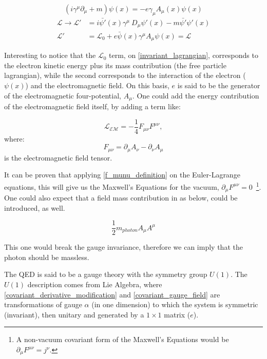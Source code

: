\begin{equation}
        (i \gamma^\mu \partial_\mu + m)\psi(x) = -e\gamma_\mu A_\mu(x) \psi(x) 
    \label{invariant_dirac_equation}
\end{equation}
\begin{equation}
    \begin{split}
        \mathcal{L} \rightarrow \mathcal{L'} &= i\bar{\psi'}(x)\gamma^\mu\ D_\mu\psi'(x)-m\bar{\psi'}\psi'(x) \\
        \mathcal{L'} &= \mathcal{L_{\text{0}}} + e\bar{\psi}(x)\gamma^\mu A_\mu \psi(x) = \mathcal{L}
    \end{split}
    \label{invariant_lagrangian}
\end{equation}

Interesting to notice that the $\mathcal{L_{\text{0}}}$ term, on \ref{invariant_lagrangian}, corresponds to the electron kinetic energy plus its mass contribution (the free particle lagrangian), while the second corresponds to the interaction of the electron ($\psi(x)$) and the electromagnetic field. On this basis, $e$ is said to be the generator of the electromagnetic four-potential, $A_\mu$. One could add the energy contribution of the electromagnetic field itself, by adding a term like:

\begin{equation}
    \mathcal{L_{\text{EM}}} = - \frac{1}{4} F_{\mu\nu} F^{\mu\nu},
\label{lagragian_em}
\end{equation}
where:
\begin{equation}
    F_{\mu\nu} = \partial_\mu A_\nu - \partial_\nu A_\mu
\label{f_munu_definition}
\end{equation}
is the electromagnetic field tensor.

It can be proven that applying \ref{f_munu_definition} on the Euler-Lagrange equations, this will give us the Maxwell's Equations for the vacuum, $\partial_{\mu} F^{\mu\nu} = 0$~\footnote{A non-vacuum covariant form of the Maxwell's Equations would be $\partial_{\mu} F^{\mu\nu} = j^{\nu}$.}. One could also expect that a field mass contribution in as below, could be introduced, as well.

\begin{equation}
    \frac{1}{2}m_{photon} A_\mu A^\mu
\label{photon_mass_term}
\end{equation}

This one would break the gauge invariance, therefore we can imply that the photon should be massless.

The QED is said to be a gauge theory with the symmetry group $U(1)$. The $U(1)$ description comes from Lie Algebra, where \ref{covariant_derivative_modification} and \ref{covariant_gauge_field} are transformations of gauge $\alpha$ (in one dimension) to which the system is symmetric (invariant), then unitary and generated by a $1 \times 1$ matrix ($e$).

